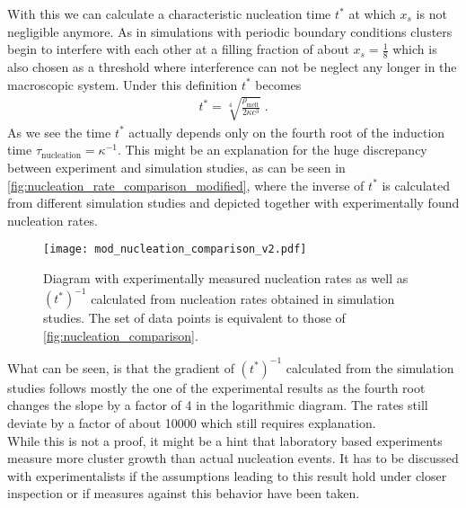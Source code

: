 With this we can calculate a characteristic nucleation time $t^*$ at which $x_s$ is not negligible anymore. As in simulations with periodic boundary conditions clusters begin to interfere with each other at a filling fraction of about $x_s=\frac{1}{8}$ which is also chosen as a threshold where interference can not be neglect any longer in the macroscopic system. Under this definition $t^*$ becomes
\begin{align}
\label{eqn:nucleation_time_modified}
t^* = \sqrt[4]{\frac{\rho_{\text{melt}}}{2 \kappa c^3 }} \; \text{.}
\end{align}
As we see the time $t^*$ actually depends only on the fourth root of the induction time $\tau_{\text{nucleation}} = \kappa^{-1}$. This might be an explanation for the huge discrepancy between experiment and simulation studies, as can be seen in \autoref{fig:nucleation_rate_comparison_modified}, where the inverse of $t^*$ is calculated from different simulation studies and depicted together with experimentally found nucleation rates.\\
\begin{figure}[h]
\centering
\texttt{[image: mod\_nucleation\_comparison\_v2.pdf]}
\caption[Nucleation rate comparison under assumption of early filled boxes]{Diagram with experimentally measured nucleation rates\cite{Harland1997,He1996,schaetzel1993,Sinn2001,Auer2001} as well as $(t^*)^{-1}$ calculated from nucleation rates obtained in simulation studies\cite{Filion2010a,Fiorucci2020a,Schilling2011}. The set of data points is equivalent to those of \autoref{fig:nucleation_comparison}.}
\label{fig:nucleation_rate_comparison_modified}
\end{figure}

What can be seen, is that the gradient of $(t^*)^{-1}$ calculated from the simulation studies follows mostly the one of the experimental results as the fourth root changes the slope by a factor of 4 in the logarithmic diagram. The rates still deviate by a factor of about 10000 which still requires explanation.\\

While this is not a proof, it might be a hint that laboratory based experiments measure more cluster growth than actual nucleation events. It has to be discussed with experimentalists if the assumptions leading to this result hold under closer inspection or if measures against this behavior have been taken.

